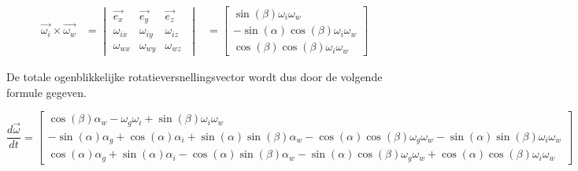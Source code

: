 \begin{equation*}
\begin{split}
\overrightarrow{\omega_{i}}\times\overrightarrow{\omega_{w}}
&=	\begin{vmatrix}
	\overrightarrow{e_{x}} & \overrightarrow{e_{y}} & \overrightarrow{e_{z}}\\
	\omega_{ix} & \omega_{iy} & \omega_{iz}\\
	\omega_{wx} & \omega_{wy} & \omega_{wz}\
	\end{vmatrix}
&=	\begin{bmatrix}
	\sin(\beta)\omega_{i}\omega_{w}\\
	-\sin(\alpha)\cos(\beta)\omega_{i}\omega_{w}\\
	\cos(\beta)\cos(\beta)\omega_{i}\omega_{w}\
	\end{bmatrix}
\end{split}
\end{equation*}

De totale ogenblikkelijke rotatieversnellingsvector wordt dus door de volgende formule gegeven.

\begin{equation*}
\frac{d\overrightarrow{\omega}}{dt}
=	\begin{bmatrix}
\cos(\beta)\alpha_{w}-\omega_{g}\omega_{i}+\sin(\beta)\omega_{i}\omega_{w}\\
-\sin(\alpha)\alpha_{g}+\cos(\alpha)\alpha_{i}+\sin(\alpha)\sin(\beta)\alpha_{w}-\cos(\alpha)\cos(\beta)\omega_{g}\omega_{w}-\sin(\alpha)\sin(\beta)\omega_{i}\omega_{w}\\
\cos(\alpha)\alpha_{g}+\sin(\alpha)\alpha_{i}-\cos(\alpha)\sin(\beta)\alpha_{w}-\sin(\alpha)\cos(\beta)\omega_{g}\omega_{w}+\cos(\alpha)\cos(\beta)\omega_{i}\omega_{w}\
\end{bmatrix}
\end{equation*}